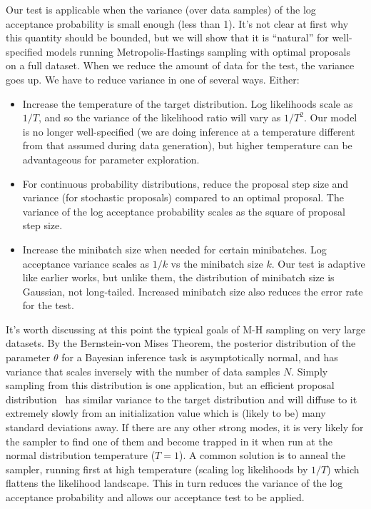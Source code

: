 \documentclass[twoside]{article} \usepackage{aistats2017}
\begin{document}
Our test is applicable when the variance (over data samples) of the log
acceptance probability is small enough (less than 1). It's not clear at first why
this quantity should be bounded, but we will show that it is ``natural'' for
well-specified models running Metropolis-Hastings sampling with optimal
proposals~\citep{OptimalScaling01} on a full dataset. When we reduce the amount
of data for the test, the variance goes up. We have to reduce variance in one
of several ways. Either:

\begin{itemize}[noitemsep]
\item Increase the temperature of the target distribution. Log likelihoods
  scale as $1/T$, and so the variance of the likelihood ratio will
  vary as $1/T^2$. Our model is no longer well-specified (we are doing inference
  at a temperature different from that assumed during data generation), but
  higher temperature can be advantageous for parameter exploration.
\item For continuous probability distributions, reduce the proposal
  step size and variance (for stochastic proposals) compared to an optimal
  proposal. The variance of the log acceptance probability scales as the
  square of proposal step size. 
\item Increase the minibatch size when needed for certain
  minibatches. Log acceptance variance scales as $1/k$ vs the
  minibatch size $k$. Our test is adaptive like earlier works, but
  unlike them, the distribution of minibatch size is Gaussian, not
  long-tailed.  Increased minibatch size also reduces the error rate
  for the test.
\end{itemize}

It's worth discussing at this point the typical goals of
M-H sampling on very large datasets.  By the Bernstein-von Mises
Theorem, the posterior distribution of the parameter $\theta$ for a
Bayesian inference task is asymptotically normal, and has variance
that scales inversely with the number of data samples $N$. %
Simply sampling from this distribution is one
application, but an efficient proposal distribution~\citep{OptimalScaling01} has similar variance to the target
distribution and will diffuse to it extremely slowly from an
initialization value which is (likely to be) many standard deviations
away. If there are any other strong modes, it is very likely for the
sampler to find one of them and become trapped in it when run at the
normal distribution temperature ($T=1$). A common solution is to anneal
the sampler, running first at high temperature (scaling log
likelihoods by $1/T$) which flattens the likelihood landscape.  This in
turn reduces the variance of the log acceptance probability and allows
our acceptance test to be applied.
\end{document}
